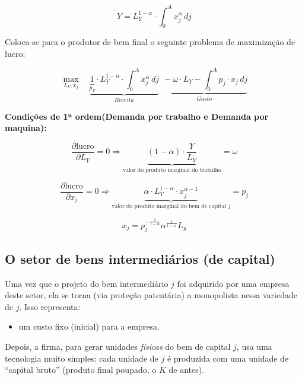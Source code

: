 \documentclass[a4paper,12pt]{article}[abntex2]
\begin{document}
\begin{equation}
Y = L_Y^{1 - \alpha} \cdot \int_0^A x_j^{\alpha} \, dj \tag{10''}
\end{equation}

Coloca-se para o produtor de bem final o seguinte problema de maximização de lucro:

\begin{equation}
\max_{L_Y, x_j} \quad \underbrace{\underbrace{1}_{p_Y} \cdot L_Y^{1 - \alpha} \cdot \int_0^A x_j^{\alpha} \, dj}_{Receita} \ \underbrace{ \  - \omega \cdot L_Y - \int_0^A p_j \cdot x_j \, dj}_{Gasto} \tag{11}
\end{equation}

\vspace{0.2cm}
\noindent\textbf{Condições de 1ª ordem(Demanda por trabalho e Demanda por maquina):}

\begin{equation}
\frac{\partial \text{lucro}}{\partial L_Y} = 0 
\Rightarrow \underbrace{(1 - \alpha) \cdot \frac{Y}{L_Y}}_\text{valor do produto marginal do trabalho} = \omega \tag{12}
\end{equation}

\begin{equation}
\frac{\partial \text{lucro}}{\partial x_j} = 0 
\Rightarrow \underbrace{\alpha \cdot L_Y^{1 - \alpha} \cdot x_j^{\alpha - 1}}_\text{valor do produto marginal do bem de capital $j$} = p_j \tag{13}
\end{equation}

\begin{equation}
    x_j=p_j^{-\frac{1}{1-\alpha}}\alpha^{\frac{1}{1-\alpha}}L_y \tag{13'}
\end{equation}


\subsection{\textbf{O setor de bens intermediários (de capital)}}

Uma vez que o projeto do bem intermediário $j$ foi adquirido por uma empresa deste setor, ela se torna (via proteção patentária) a monopolista nessa variedade de $j$. Isso representa:

\begin{itemize}
  \item um custo fixo (inicial) para a empresa.
\end{itemize}

Depois, a firma, para gerar unidades \textit{físicas} do bem de capital $j$, usa uma tecnologia muito simples: cada unidade de $j$ é produzida com uma unidade de ``capital bruto'' (produto final poupado, o $K$ de antes).
\end{document}
